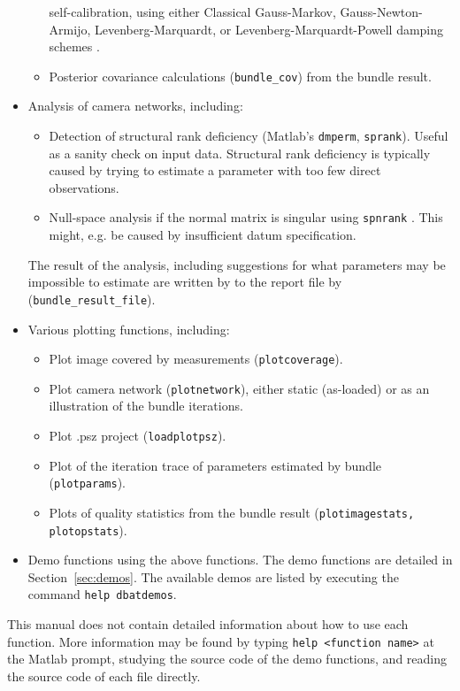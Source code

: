 \documentclass{article}
\begin{document}
\begin{itemize}
\begin{itemize}
    self-calibration, using either Classical Gauss-Markov,
    Gauss-Newton-Armijo, Levenberg-Marquardt, or
    Levenberg-Marquardt-Powell damping schemes
    \citep{Borlin2013:Bundle,Borlin2014:Camera,Borlin2016:External}.
  \item Posterior covariance calculations (\texttt{bundle\_cov}) from
    the bundle result.
  \end{itemize}
\item Analysis of camera networks, including:
  \begin{itemize}
  \item Detection of structural rank deficiency (Matlab's
    \texttt{dmperm}, \texttt{sprank}). Useful as a sanity check on
    input data. Structural rank deficiency is typically caused by
    trying to estimate a parameter with too few direct observations.
  \item Null-space analysis if the normal matrix is singular using
    \texttt{spnrank} \citep{Foster2009:Calculating}. This might, e.g.
    be caused by insufficient datum specification.
  \end{itemize}
  The result of the analysis, including suggestions for what
  parameters may be impossible to estimate are written by to the report
  file by (\texttt{bundle\_result\_file}).
\item Various plotting functions, including:
  \begin{itemize}
  \item Plot image covered by measurements
    (\texttt{plotcoverage}).
  \item Plot camera network (\texttt{plotnetwork}), either static
    (as-loaded) or as an illustration of the bundle iterations.
  \item Plot .psz project (\texttt{loadplotpsz}).
  \item Plot of the iteration trace of parameters estimated by bundle
    (\texttt{plotparams}).
  \item Plots of quality statistics from the bundle result
    (\texttt{plotimagestats, plotopstats}).
  \end{itemize}
\item Demo functions using the above functions. The demo functions are
  detailed in Section~\ref{sec:demos}. The available demos are listed
  by executing the command \texttt{help dbatdemos}.
\end{itemize}

This manual does not contain detailed information about how to use
each function. More information may be found by typing \texttt{help
  <function name>} at the Matlab prompt, studying the source code of
the demo functions, and reading the source code of each file directly.
\end{document}
